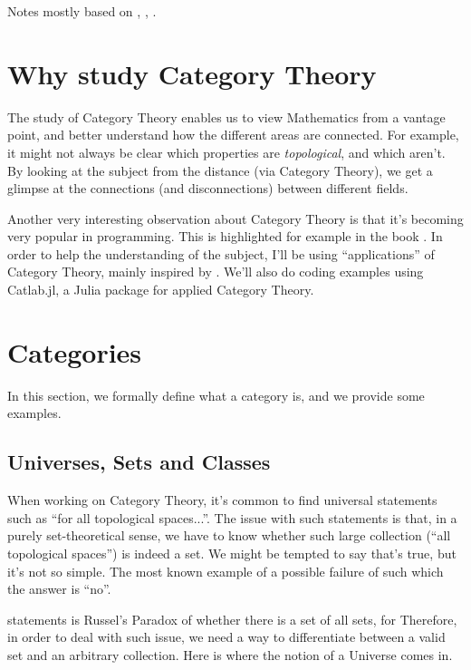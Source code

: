 Notes mostly based on \citet{maico2020categoria},
\citet{bradley2020topology}, \citet{borceux1994handbook}.

\section{Why study Category Theory}

The study of Category Theory enables us to view Mathematics from a vantage
point, and better understand how the different areas are connected. For example,
it might not always be clear which properties are \textit{topological}, and which aren't.
By looking at the subject from the distance (via Category Theory), we get
a glimpse at the connections (and disconnections) between different fields.

Another very interesting observation about Category Theory is that it's
becoming very popular in programming. This is highlighted for example
in the book \citet{milewski2018category}. In order to help
the understanding of the subject, I'll be using ``applications''
of Category Theory, mainly inspired by \citet{fong2019invitation}.
We'll also do coding examples using Catlab.jl, a Julia package
for applied Category Theory.

\section{Categories}

In this section, we formally define what a category is, and we provide
some examples.

\subsection{Universes, Sets and Classes}

When working on Category Theory, it's common to find universal
statements such as ``for all topological spaces...''. The issue
with such statements is that, in a purely set-theoretical sense,
we have to know whether such large collection (``all topological spaces'')
is indeed a set. We might be tempted to say that's true, but
it's not so simple. The most known example of a possible failure of such
which the answer is ``no''.

statements is Russel's Paradox of whether there is a set of all sets, for
Therefore, in order to deal with such issue, we need a way to differentiate
between a valid set and an arbitrary collection. Here is where the notion of a Universe comes in.

